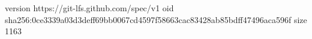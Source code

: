 version https://git-lfs.github.com/spec/v1
oid sha256:0ce3339a03d3deff69bb0067cd4597f58663cac83428ab85bdff47496aca596f
size 1163

